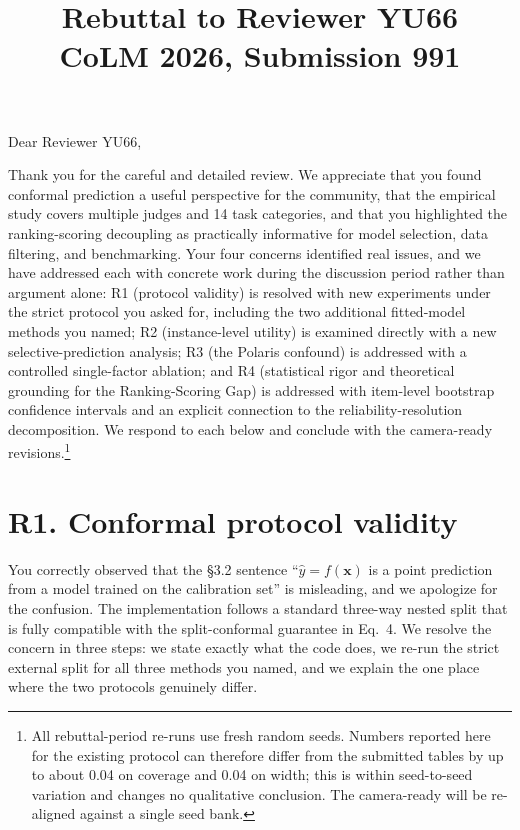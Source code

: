 \documentclass[11pt]{article}
\title{Rebuttal to Reviewer YU66\\
\large CoLM 2026, Submission 991}
\author{}
\date{}
\begin{document}
\maketitle

Dear Reviewer YU66,

Thank you for the careful and detailed review. We appreciate that you found conformal prediction a useful perspective for the community, that the empirical study covers multiple judges and 14 task categories, and that you highlighted the ranking-scoring decoupling as practically informative for model selection, data filtering, and benchmarking. Your four concerns identified real issues, and we have addressed each with concrete work during the discussion period rather than argument alone: R1 (protocol validity) is resolved with new experiments under the strict protocol you asked for, including the two additional fitted-model methods you named; R2 (instance-level utility) is examined directly with a new selective-prediction analysis; R3 (the Polaris confound) is addressed with a controlled single-factor ablation; and R4 (statistical rigor and theoretical grounding for the Ranking-Scoring Gap) is addressed with item-level bootstrap confidence intervals and an explicit connection to the reliability-resolution decomposition. We respond to each below and conclude with the camera-ready revisions.\footnote{All rebuttal-period re-runs use fresh random seeds. Numbers reported here for the existing protocol can therefore differ from the submitted tables by up to about 0.04 on coverage and 0.04 on width; this is within seed-to-seed variation and changes no qualitative conclusion. The camera-ready will be re-aligned against a single seed bank.}

\section*{R1. Conformal protocol validity}

You correctly observed that the \S 3.2 sentence ``$\hat{y} = f(\mathbf{x})$ is a point prediction from a model trained on the calibration set'' is misleading, and we apologize for the confusion. The implementation follows a standard three-way nested split that is fully compatible with the split-conformal guarantee in Eq.\ 4. We resolve the concern in three steps: we state exactly what the code does, we re-run the strict external split for all three methods you named, and we explain the one place where the two protocols genuinely differ.
\end{document}
